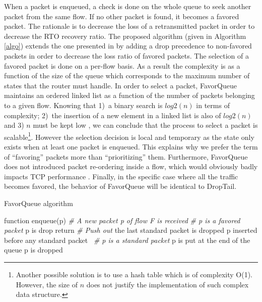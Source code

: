 \documentclass{elsart}
\begin{document}
When a packet is enqueued, a check is done on the whole queue to seek another packet from the same flow. If no other packet is found, it becomes a favored packet. The rationale is to decrease the loss of a retransmitted packet in order to decrease the RTO recovery ratio.
The proposed algorithm (given in Algorithm \ref{algo}) extends the one presented in \cite{dedu09pdp} by adding a drop precedence to non-favored packets in order to decrease the loss ratio of favored packets.
The selection of a favored packet is done on a per-flow basis. As a result the complexity is as a function of the size of the queue which corresponds to the maximum number of states that the router must handle. In order to select a packet, FavorQueue maintains an ordered linked list as a function of the number of packets belonging to a given flow. Knowing that 1)~a binary search is $log2(n)$ in terms of complexity; 2)~the insertion of a new element in a linked list is also of $log2(n)$ and 3) $n$ must be kept low \cite{Appenzeller04}, we can conclude that the process to select a packet is scalable\footnote{Another possible solution is to use a hash table which is of complexity O(1). However, the size of $n$ does not justify the implementation of such complex data structure.}.
    However the selection decision is local and temporary as the state only exists when at least one packet is enqueued. This explains why we prefer the term of ``favoring'' packets more than ``prioritizing'' them. Furthermore, FavorQueue does not introduced packet re-ordering inside a flow, which would obviously badly impacts TCP performance \cite{Arthur07}. 
Finally, in the specific case where all the traffic becomes favored, the behavior of FavorQueue will be identical to DropTail.

\begin{algorithm}[t]
\caption{FavorQueue algorithm}
\label{algo}
\begin{algorithmic}[1]
\STATE function enqueue(p)
\STATE \textit{\# A new packet p of flow F is received}
\STATE \textit{\# p is a favored packet}
 			\STATE p is drop
			\STATE return
		\ENDIF
        \ELSE
            	\STATE \textit{\# Push out}
		\STATE the last standard packet is dropped
	\ENDIF
\STATE  p inserted before any standard packet\ 
\ELSE
	\STATE \textit{\# p is a standard packet}
		\STATE p is put at the end of the queue
	\ELSE
		\STATE p is dropped
	\ENDIF 
\ENDIF 
\end{algorithmic}
\end{algorithm}
\end{document}
